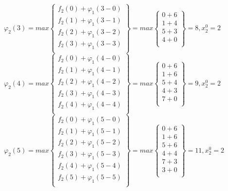 $\varphi_2(3) = max \begin{Bmatrix}
    f_2(0) + \varphi_1(3 - 0) \\
    f_2(1) + \varphi_1(3 - 1) \\
    f_2(2) + \varphi_1(3 - 2) \\
    f_2(3) + \varphi_1(3 - 3) \\
\end{Bmatrix} = max \begin{Bmatrix}
    0 + 6 \\
    1 + 4 \\
    5 + 3 \\
    4 + 0 \\
\end{Bmatrix} = 8, x_2^0 = 2$\\

$\varphi_2(4) = max \begin{Bmatrix}
    f_2(0) + \varphi_1(4 - 0) \\
    f_2(1) + \varphi_1(4 - 1) \\
    f_2(2) + \varphi_1(4 - 2) \\
    f_2(3) + \varphi_1(4 - 3) \\
    f_2(4) + \varphi_1(4 - 4) \\
\end{Bmatrix} = max \begin{Bmatrix}
    0 + 6 \\
    1 + 6 \\
    5 + 4 \\
    4 + 3 \\
    7 + 0 \\
\end{Bmatrix} = 9, x_2^0 = 2$\\

$\varphi_2(5) = max \begin{Bmatrix}
    f_2(0) + \varphi_1(5 - 0) \\
    f_2(1) + \varphi_1(5 - 1) \\
    f_2(2) + \varphi_1(5 - 2) \\
    f_2(3) + \varphi_1(5 - 3) \\
    f_2(4) + \varphi_1(5 - 4) \\
    f_2(5) + \varphi_1(5 - 5) \\
\end{Bmatrix} = max \begin{Bmatrix}
    0 + 6 \\
    1 + 6 \\
    5 + 6 \\
    4 + 4 \\
    7 + 3 \\
    3 + 0 \\
\end{Bmatrix} = 11, x_2^0 = 2$\\


